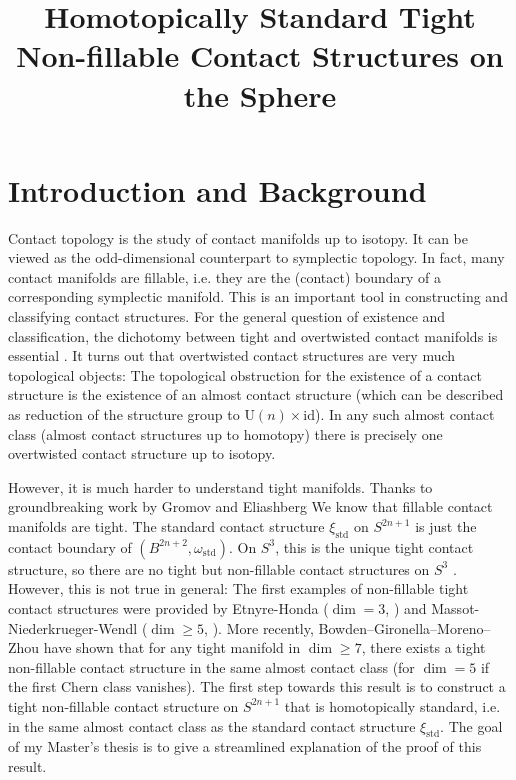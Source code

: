 \documentclass{amsart}
\begin{document}
\title[Homotopically Standard Tight Non-fillable Contact Structures]{Homotopically Standard Tight Non-fillable Contact Structures on the Sphere}
\maketitle
\section*{Introduction and Background}
\noindent Contact topology is the study of contact manifolds up to isotopy. It can be viewed as the
odd-dimensional counterpart to symplectic topology.
In fact, many contact manifolds are fillable, i.e. they are the (contact) boundary of a 
corresponding symplectic  manifold. This is an important tool in constructing and 
classifying contact structures.
For the general question of existence and classification, the dichotomy between tight and 
overtwisted contact manifolds is essential \cite{Eliashberg89,BEM15}.
It turns out that overtwisted contact structures are very much topological objects:
The topological obstruction for the existence of a contact structure is the existence of
an almost contact structure (which can be described as reduction of the structure group to 
$\mathrm U(n) \times \mathrm{id}$). 
In any such almost contact class (almost contact structures up to homotopy) 
there is precisely one overtwisted contact structure up to isotopy.

However, it is much harder to understand tight manifolds.
Thanks to groundbreaking work by Gromov and Eliashberg \cite{Gromov85,Eliashberg91} 
We know that fillable contact manifolds are tight. The standard contact structure 
$\xi_\mathrm{std}$ on $S^{2n+1}$ is just the contact boundary of $(B^{2n+2}, \omega_\mathrm{std})$.
On $S^3$, this is the unique tight contact structure, so there are no tight but non-fillable 
contact structures on $S^3$ \cite{Eliashberg92}. However, this is not true in general:
The first examples of non-fillable tight contact structures were provided by
Etnyre-Honda ($\dim = 3$, \cite{EH02}) and Massot-Niederkrueger-Wendl ($\dim \ge 5$, \cite{MNW13}).
More recently, Bowden--Gironella--Moreno--Zhou \cite{BGMZ22} have shown that for any
tight manifold in $\dim \ge 7$, there exists a tight non-fillable contact structure in
the same almost contact class (for $\dim = 5$ if the first Chern class vanishes). 
The first step towards this result is to construct a tight non-fillable contact structure
on $S^{2n+1}$ that is homotopically standard, i.e. in the same almost contact class
as the standard contact structure $\xi_\mathrm{std}$.
The goal of my Master's thesis is to give a streamlined explanation of the proof of this result.
\end{document}
